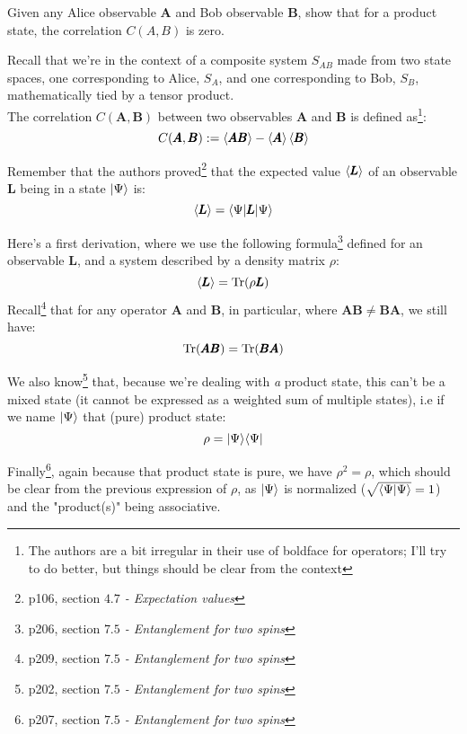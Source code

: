 \documentclass[solutions.tex]{subfiles}
\begin{document}
\maketitle
\begin{exercise} Given any Alice observable $\bm{A}$ and Bob observable
$\bm{B}$, show that for a product state, the correlation $C(A, B)$ is zero.
\end{exercise}

Recall that we're in the context of a composite system $S_{AB}$ made from two
state spaces, one corresponding to Alice, $S_A$, and one corresponding to Bob,
$S_B$, mathematically tied by a tensor product. \\

The correlation $C(\bm{A}, \bm{B})$ between two observables $\bm{A}$ and $\bm{B}$
is defined as\footnote{The authors are a bit irregular in their use of boldface
for operators; I'll try to do better, but things should be clear from the context}:
\[
	C(\pmb{A}, \pmb{B}) := \left\langle \pmb{AB} \right\rangle - \left\langle \pmb{A} \right\rangle\left\langle \pmb{B} \right\rangle
\]

Remember that the authors proved\footnote{p106, section \textit{%
$4.7$ - Expectation values}} that the expected value
$\left\langle \pmb{L} \right\rangle$ of an observable $\bm{L}$ being
in a state $|\Psi\rangle$ is:
\[
	\left\langle \pmb{L} \right\rangle = \langle \Psi|\pmb{L}|\Psi\rangle
\]

\hr
Here's a first derivation, where we use the following formula\footnote{p206,
section \textit{$7.5$ - Entanglement for two spins}} defined for an
observable $\bm{L}$, and a system described by a density matrix $\rho$:
\[
	\left\langle \pmb{L} \right\rangle = \text{Tr}(\rho\pmb{L})
\]
Recall\footnote{p209, section \textit{$7.5$ - Entanglement for two spins}}
 that for any operator $\bm{A}$ and $\bm{B}$, in particular,
where $\bm{AB} \neq \bm{BA}$, we still have:
\[
	\text{Tr}(\pmb{AB}) = \text{Tr}(\pmb{BA})
\]

We also know\footnote{p202, section \textit{$7.5$ - Entanglement for two spins}}
that, because we're dealing with \textit{a} product state, this can't be
a mixed state (it cannot be expressed as a weighted sum of multiple
states), i.e if we name $|\Psi\rangle$ that (pure) product state:
\[
	\rho = |\Psi\rangle\langle \Psi|
\]

Finally\footnote{p207, section \textit{$7.5$ - Entanglement for two spins}},
again because that product state is pure, we have $\rho^2 = \rho$, which
should be clear from the previous expression of $\rho$, as $|\Psi\rangle$ is
normalized ($\sqrt{\left\langle \Psi \middle| \Psi \right\rangle} = 1$) and the "product(s)" being
associative.\\
\end{document}
